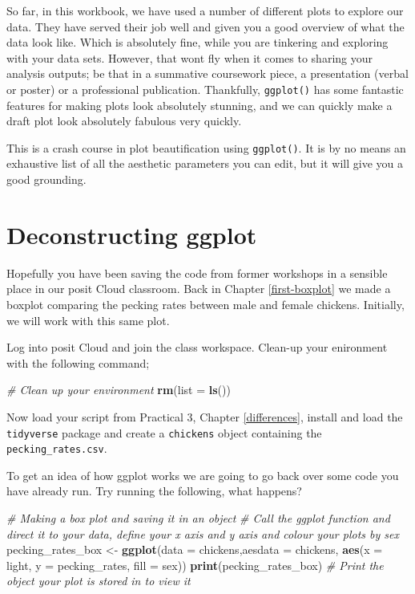 \documentclass[
]{book}
\newenvironment{Shaded}{\begin{snugshade}}{\end{snugshade}}
\newcommand{\AttributeTok}[1]{\textcolor[rgb]{0.13,0.29,0.53}{#1}}
\newcommand{\CommentTok}[1]{\textcolor[rgb]{0.56,0.35,0.01}{\textit{#1}}}
\newcommand{\FunctionTok}[1]{\textcolor[rgb]{0.13,0.29,0.53}{\textbf{#1}}}
\newcommand{\NormalTok}[1]{#1}
\newcommand{\OtherTok}[1]{\textcolor[rgb]{0.56,0.35,0.01}{#1}}
\begin{document}
So far, in this workbook, we have used a number of different plots to explore our data. They have served their job well and given you a good overview of what the data look like. Which is absolutely fine, while you are tinkering and exploring with your data sets. However, that wont fly when it comes to sharing your analysis outputs; be that in a summative coursework piece, a presentation (verbal or poster) or a professional publication. Thankfully, \texttt{ggplot()} has some fantastic features for making plots look absolutely stunning, and we can quickly make a draft plot look absolutely fabulous very quickly.

This is a crash course in plot beautification using \texttt{ggplot()}. It is by no means an exhaustive list of all the aesthetic parameters you can edit, but it will give you a good grounding.

\hypertarget{deconstructing-ggplot}{%
\section{Deconstructing ggplot}\label{deconstructing-ggplot}}

Hopefully you have been saving the code from former workshops in a sensible place in our posit Cloud classroom. Back in Chapter \ref{first-boxplot} we made a boxplot comparing the pecking rates between male and female chickens. Initially, we will work with this same plot.

Log into posit Cloud and join the class workspace. Clean-up your enironment with the following command;

\begin{Shaded}
\begin{Highlighting}[]
\CommentTok{\# Clean up your environment}
\FunctionTok{rm}\NormalTok{(}\AttributeTok{list =} \FunctionTok{ls}\NormalTok{())}
\end{Highlighting}
\end{Shaded}

Now load your script from Practical 3, Chapter \ref{differences}, install and load the \texttt{tidyverse} package and create a \texttt{chickens} object containing the \texttt{pecking\_rates.csv}.

To get an idea of how ggplot works we are going to go back over some code you have already run. Try running the following, what happens?

\begin{Shaded}
\begin{Highlighting}[]
\CommentTok{\# Making a box plot and saving it in an object}
\CommentTok{\# Call the ggplot function and direct it to your data, define your x axis and y axis and colour your plots by sex}
\NormalTok{pecking\_rates\_box }\OtherTok{\textless{}{-}} \FunctionTok{ggplot}\NormalTok{(}\AttributeTok{data =}\NormalTok{ chickens,}\AttributeTok{aesdata =}\NormalTok{ chickens, }\FunctionTok{aes}\NormalTok{(}\AttributeTok{x =}\NormalTok{ light, }\AttributeTok{y =}\NormalTok{ pecking\_rates, }\AttributeTok{fill =}\NormalTok{ sex)) }
\FunctionTok{print}\NormalTok{(pecking\_rates\_box) }\CommentTok{\# Print the object your plot is stored in to view it}
\end{Highlighting}
\end{Shaded}
\end{document}
